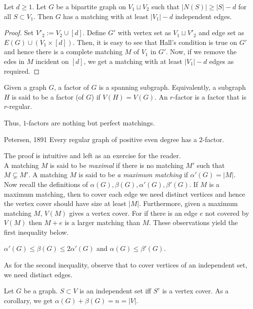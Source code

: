 \documentclass[../basic_graph_theory.tex]{subfiles}
\begin{document}
%
\begin{prop}
    Let $d \geq 1$. Let $G$ be a bipartite graph on $V_1 \sqcup V_2$ such that $|N(S)| \geq |S| - d$ for all $S \subset V_1$. Then $G$ has a matching with at least $|V_1| - d$ independent edges.
\end{prop}
%
\begin{proof}
    Set $V'_2 := V_2 \cup [d]$. Define $G'$ with vertex set as $V_1 \sqcup V'_2$ and edge set as $E(G) \cup (V_1 \times [d])$. Then, it is easy to see that Hall's condition is true on $G'$ and hence there is a complete matching $M$ of $V_1$ in $G'$. Now, if we remove the edes in $M$ incident on $[d]$, we get a matching with at least $|V_1| - d$ edges as required.
\end{proof}
%
\begin{defn}
    Given a graph $G$,  a factor of $G$ is a spanning subgraph.  Equivalently,  a subgraph $H$ is said to be a factor (of $G$) if $V(H) = V(G)$. An $r$-factor is a factor that is $r$-regular.
\end{defn}
%
Thus, $1$-factors are nothing but perfect matchings.
%
\begin{Thm}{Petersen, 1891}{}
    Every regular graph of positive even degree has a $2$-factor.
\end{Thm}
%
The proof is intuitive and left as an exercise for the reader.\\
A matching $M$ is said to be {\em maximal} if there is no matching $M'$ such that $M \subsetneq M'$.  A matching $M$ is said to be {\em a maximum matching} if $\alpha'(G) = |M|$.\\
Now recall the definitions of $\alpha(G), \beta(G), \alpha'(G), \beta'(G)$. If $M$ is a maximum matching, then to cover each edge we need distinct vertices and hence the vertex cover should have size at least $|M|$.  Furthermore,  given a maximum matching $M$,   $V(M)$ gives a vertex cover.   For if there is an edge $e$ not covered by $V(M)$ then $M+e$ is a larger matching than $M$.  These observations yield the first inequality below.\\
%
\begin{center}
    $\alpha'(G) \leq  \beta(G) \leq 2 \alpha'(G)$ and $\alpha(G) \leq \beta'(G).$ \\
\end{center}
%
As for the second inequality, observe that to cover vertices of an independent set, we need distinct edges.
%
\begin{lem}
    Let $G$ be a graph. $S \subset V$ is an independent set iff $S^c$ is a vertex cover. As a corollary, we get $\alpha(G) + \beta(G) = n = |V|.$
\end{lem}
\end{document}
